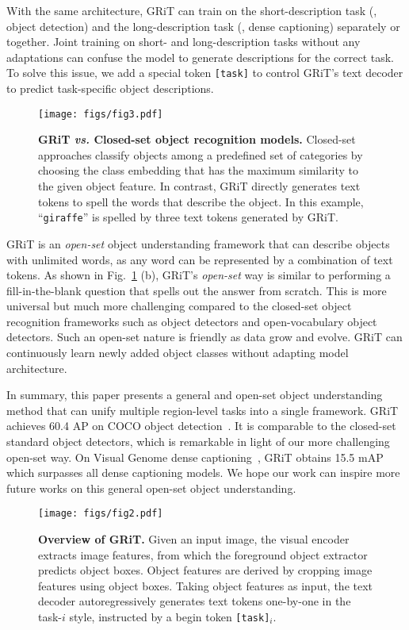 \documentclass[10pt,twocolumn,letterpaper]{article}
\begin{document}
With the same architecture, GRiT can train on the short-description task (\eg, object detection) and the long-description task (\eg, dense captioning) separately or together. Joint training on short- and long-description tasks without any adaptations can confuse the model to generate descriptions for the correct task. To solve this issue, we add a special token \texttt{[task]} to control GRiT's text decoder to predict task-specific object descriptions. 

\begin{figure}[t]
	\centering
	\texttt{[image: figs/fig3.pdf]}
	\caption{\textbf{GRiT \emph{vs.} Closed-set object recognition models.} Closed-set approaches classify objects among a predefined set of categories by choosing the class embedding that has the maximum similarity to the given object feature. In contrast, GRiT directly generates text tokens to spell the words that describe the object. In this example, ``\texttt{giraffe}'' is spelled by three text tokens generated by GRiT.}
	\label{fig:fig3}
\end{figure}

GRiT is an \emph{open-set} object understanding framework that can describe objects with unlimited words, as any word can be represented by a combination of text tokens. As shown in Fig.~\ref{fig:fig3} (b), GRiT's \emph{open-set} way is similar to performing a fill-in-the-blank question that spells out the answer from scratch. This is more universal but much more challenging compared to the closed-set object recognition frameworks such as object detectors and open-vocabulary object detectors. Such an open-set nature is friendly as data grow and evolve. GRiT can continuously learn newly added object classes without adapting model architecture.

In summary, this paper presents a general and open-set object understanding method that can unify multiple region-level tasks into a single framework. GRiT achieves 60.4 AP on COCO object detection~\cite{lin2014microsoft}. It is comparable to the closed-set standard object detectors, which is remarkable in light of our more challenging open-set way. On Visual Genome dense captioning~\cite{krishna2017visual}, GRiT obtains 15.5 mAP which surpasses all dense captioning models. We hope our work can inspire more future works on this general open-set object understanding.

\begin{figure*}[h]
	\centering
	\texttt{[image: figs/fig2.pdf]}
	\caption{\textbf{Overview of GRiT.} Given an input image, the visual encoder extracts image features, from which the foreground object extractor predicts object boxes. Object features are derived by cropping image features using object boxes. Taking object features as input, the text decoder autoregressively generates text tokens one-by-one in the task-$i$ style, instructed by a begin token \texttt{[task]}$_i$.}
	\label{fig:overview}
\end{figure*}
\end{document}
